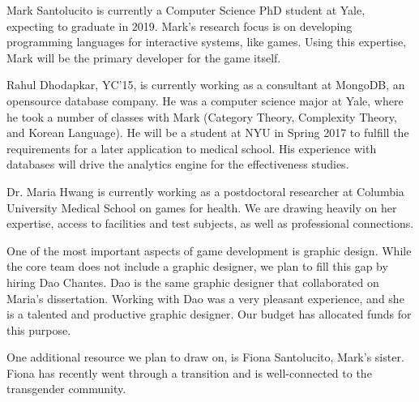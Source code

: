 Mark Santolucito is currently a Computer Science PhD student at Yale, expecting to graduate in 2019.
Mark's research focus is on developing programming languages for interactive systems, like games.
Using this expertise, Mark will be the primary developer for the game itself.

Rahul Dhodapkar, YC'15, is currently working as a consultant at MongoDB, an opensource database company.
He was a computer science major at Yale, where he took a number of classes with Mark (Category Theory, Complexity Theory, and Korean Language).
He will be a student at NYU in Spring 2017 to fulfill the requirements for a later application to medical school. 
His experience with databases will drive the analytics engine for the effectiveness studies. 

Dr. Maria Hwang is currently working as a postdoctoral researcher at Columbia University Medical School on games for health. We are drawing heavily on her expertise, access to facilities and test subjects, as well as professional connections.

One of the most important aspects of game development is graphic design. While the core team does not include a graphic designer, we plan to fill this gap by hiring Dao Chantes. Dao is the same graphic designer that collaborated on Maria's dissertation. Working with Dao was a very pleasant experience, and she is a talented and productive graphic designer. Our budget has allocated funds for this purpose. 

One additional resource we plan to draw on, is Fiona Santolucito, Mark's sister.
Fiona has recently went through a transition and is well-connected to the transgender community.

